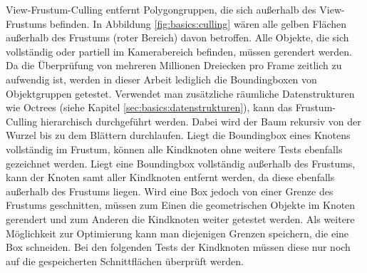 View-Frustum-Culling entfernt Polygongruppen, die sich außerhalb des View-Frustums befinden. In Abbildung \ref{fig:basics:culling} wären alle gelben Flächen außerhalb des Frustums (roter Bereich) davon betroffen. Alle Objekte, die sich vollständig oder partiell im Kamerabereich befinden, müssen gerendert werden. Da die Überprüfung von mehreren Millionen Dreiecken pro Frame zeitlich zu aufwendig ist, werden in dieser Arbeit lediglich die Boundingboxen von Objektgruppen getestet. Verwendet man zusätzliche räumliche Datenstrukturen wie Octrees (siehe Kapitel \ref{sec:basics:datenstrukturen}), kann das Frustum-Culling hierarchisch durchgeführt werden. Dabei wird der Baum rekursiv von der Wurzel bis zu dem Blättern durchlaufen. Liegt die Boundingbox eines Knotens vollständig im Frustum, können alle Kindknoten ohne weitere Tests ebenfalls gezeichnet werden. Liegt eine Boundingbox vollständig außerhalb des Frustums, kann der Knoten samt aller Kindknoten entfernt werden, da diese ebenfalls außerhalb des Frustums liegen. Wird eine Box jedoch von einer Grenze des Frustums geschnitten, müssen zum Einen die geometrischen Objekte im Knoten gerendert und zum Anderen die Kindknoten weiter getestet werden. Als weitere Möglichkeit zur Optimierung kann man diejenigen Grenzen speichern, die eine Box schneiden. Bei den folgenden Tests der Kindknoten müssen diese nur noch auf die gespeicherten Schnittflächen überprüft werden.\\
